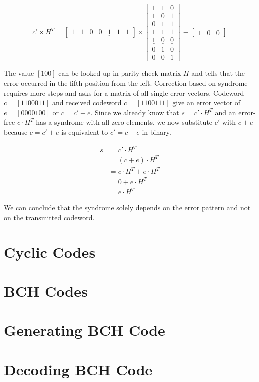 \documentclass[../main.tex]{subfiles}
\begin{document}
    \begin{equation*}
        c' \times H^T =
        \begin{bmatrix}
            1&1&0&0&\underline{1}&1&1
        \end{bmatrix}
        \times
        \begin{bmatrix}
            1&1&0\\
            1&0&1\\
            0&1&1\\
            1&1&1\\
            \underline{1}&\underline{0}&\underline{0}\\
            0&1&0\\
            0&0&1
        \end{bmatrix}
        \equiv
        \begin{bmatrix}
            1&0&0
        \end{bmatrix}
    \end{equation*}

    \noindent
    The value $[100]$ can be looked up in parity check matrix $H$ and tells that the error occurred in the fifth position from the left. Correction based on syndrome requires more steps and asks for a matrix of all single error vectors. Codeword $c=[1100011]$ and received codeword $c=[1100111]$ give an error vector of $e=[0000100]$ or $c=c'+e$. Since we already know that $s=c' \cdot H^T$ and an error-free $c \cdot H^T$ has a syndrome with all zero elements, we now substitute $c'$ with $c+e$ because $c=c'+e$ is equivalent to $c'=c+e$ in binary.

    \begin{align*}
        s &= c' \cdot H^T\\
          &= (c+e) \cdot H^T\\
          &= c \cdot H^T + e \cdot H^T\\
          &= 0 + e \cdot H^T\\
          &= e \cdot H^T
    \end{align*}

    \noindent
    We can conclude that the syndrome solely depends on the error pattern and not on the transmitted codeword.


    \section{Cyclic Codes}


    \section{BCH Codes}


    \section{Generating BCH Code}


    \section{Decoding BCH Code}
\end{document}
